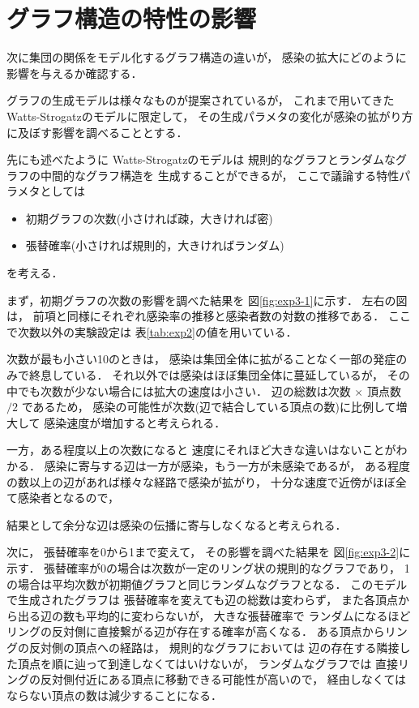 \documentclass[10pt,oneside]{scrartcl}
\begin{document}
\section{グラフ構造の特性の影響}
\label{sec:orgd1d7c37}

次に集団の関係をモデル化するグラフ構造の違いが，
感染の拡大にどのように影響を与えるか確認する．

グラフの生成モデルは様々なものが提案されているが，
これまで用いてきた
Watts-Strogatzのモデルに限定して，
その生成パラメタの変化が感染の拡がり方に及ぼす影響を調べることとする．

先にも述べたように
Watts-Strogatzのモデルは
規則的なグラフとランダムなグラフの中間的なグラフ構造を
生成することができるが，
ここで議論する特性パラメタとしては
\begin{itemize}
\item 初期グラフの次数(小さければ疎，大きければ密)
\item 張替確率(小さければ規則的，大きければランダム)
\end{itemize}
を考える．

\begin{figure*}%
  \centering
\end{figure*}

まず，初期グラフの次数の影響を調べた結果を
図\ref{fig:exp3-1}に示す．
左右の図は，
前項と同様にそれぞれ感染率の推移と感染者数の対数の推移である．
ここで次数以外の実験設定は
表\ref{tab:exp2}の値を用いている．

次数が最も小さい10のときは，
感染は集団全体に拡がることなく一部の発症のみで終息している．
それ以外では感染はほぼ集団全体に蔓延しているが，
その中でも次数が少ない場合には拡大の速度は小さい．
辺の総数は次数 \(\times\) 頂点数 \(/2\) であるため，
感染の可能性が次数(辺で結合している頂点の数)に比例して増大して
感染速度が増加すると考えられる．

一方，ある程度以上の次数になると
速度にそれほど大きな違いはないことがわかる．
感染に寄与する辺は一方が感染，もう一方が未感染であるが，
ある程度の数以上の辺があれば様々な経路で感染が拡がり，
十分な速度で近傍がほぼ全て感染者となるので，

結果として余分な辺は感染の伝播に寄与しなくなると考えられる．

次に，
張替確率を0から1まで変えて，
その影響を調べた結果を
図\ref{fig:exp3-2}に示す．
張替確率が0の場合は次数が一定のリング状の規則的なグラフであり，
1の場合は平均次数が初期値グラフと同じランダムなグラフとなる．
このモデルで生成されたグラフは
張替確率を変えても辺の総数は変わらず，
また各頂点から出る辺の数も平均的に変わらないが，
大きな張替確率で
ランダムになるほどリングの反対側に直接繋がる辺が存在する確率が高くなる．
ある頂点からリングの反対側の頂点への経路は，
規則的なグラフにおいては
辺の存在する隣接した頂点を順に辿って到達しなくてはいけないが，
ランダムなグラフでは
直接リングの反対側付近にある頂点に移動できる可能性が高いので，
経由しなくてはならない頂点の数は減少することになる．
\end{document}
